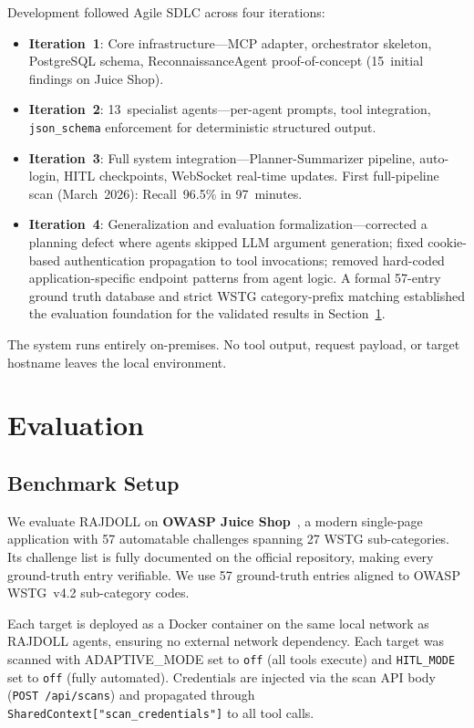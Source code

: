 \documentclass[conference]{IEEEtran}
\begin{document}
Development followed Agile SDLC across four iterations:
\begin{itemize}
  \item \textbf{Iteration~1}: Core infrastructure---MCP adapter,
    orchestrator skeleton, PostgreSQL schema,
    ReconnaissanceAgent proof-of-concept (15~initial findings
    on Juice Shop).
  \item \textbf{Iteration~2}: 13~specialist agents---per-agent
    prompts, tool integration, \texttt{json\_schema} enforcement
    for deterministic structured output.
  \item \textbf{Iteration~3}: Full system integration---Planner-Summarizer
    pipeline, auto-login, HITL checkpoints, WebSocket real-time
    updates. First full-pipeline scan (March~2026): Recall~96.5\%
    in 97~minutes.
  \item \textbf{Iteration~4}: Generalization and evaluation
    formalization---corrected a planning defect where agents skipped
    LLM argument generation; fixed cookie-based authentication
    propagation to tool invocations; removed hard-coded
    application-specific endpoint patterns from agent logic. A
    formal 57-entry ground truth database and strict WSTG
    category-prefix matching established the evaluation foundation
    for the validated results in Section~\ref{sec:eval}.
\end{itemize}

The system runs entirely on-premises. No tool output, request
payload, or target hostname leaves the local environment.

\section{Evaluation}
\label{sec:eval}

\subsection{Benchmark Setup}

We evaluate RAJDOLL on \textbf{OWASP Juice Shop}~\cite{juiceshop},
a modern single-page application with 57 automatable challenges
spanning 27 WSTG sub-categories. Its challenge list is fully
documented on the official repository, making every ground-truth
entry verifiable. We use 57 ground-truth entries aligned to
OWASP WSTG~v4.2 sub-category codes.

Each target is deployed as a Docker container on the same local
network as RAJDOLL agents, ensuring no external network dependency.
Each target was scanned with ADAPTIVE\_MODE set to \texttt{off}
(all tools execute) and \texttt{HITL\_MODE} set to \texttt{off}
(fully automated). Credentials are injected via the scan API
body (\texttt{POST /api/scans}) and propagated through
\texttt{SharedContext["scan\_credentials"]} to all tool calls.
\end{document}
